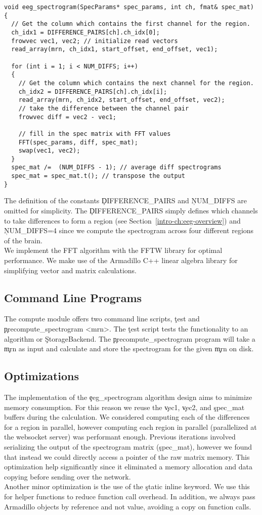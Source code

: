 \begin{lstlisting}
void eeg_spectrogram(SpecParams* spec_params, int ch, fmat& spec_mat)
{
  // Get the column which contains the first channel for the region.
  ch_idx1 = DIFFERENCE_PAIRS[ch].ch_idx[0];
  frowvec vec1, vec2; // initialize read vectors
  read_array(mrn, ch_idx1, start_offset, end_offset, vec1);

  for (int i = 1; i < NUM_DIFFS; i++)
  {
    // Get the column which contains the next channel for the region.
    ch_idx2 = DIFFERENCE_PAIRS[ch].ch_idx[i];
    read_array(mrn, ch_idx2, start_offset, end_offset, vec2);
    // take the difference between the channel pair
    frowvec diff = vec2 - vec1;

    // fill in the spec matrix with FFT values
    FFT(spec_params, diff, spec_mat);
    swap(vec1, vec2);
  }
  spec_mat /=  (NUM_DIFFS - 1); // average diff spectrograms
  spec_mat = spec_mat.t(); // transpose the output
}
\end{lstlisting}

The definition of the constants \c{DIFFERENCE\_PAIRS} and \c{NUM\_DIFFS} are
omitted for simplicity. The \c{DIFFERENCE\_PAIRS} simply defines which channels
to take differences to form a region (see Section~\ref{intro-ch:eeg-overview})
and \c{NUM\_DIFFS=4} since we compute the spectrogram across four different
regions of the brain. \\

We implement the FFT algorithm with the FFTW library \cite{fftw} for optimal
performance. We make use of the Armadillo C++ linear algebra library
\cite{arma} for simplifying vector and matrix calculations.

\subsection{Command Line Programs}\label{compute-ch:implementation-cmd}

The compute module offers two command line scripts, \c{test} and
\c{precompute\_spectrogram <mrn>}. The \c{test} script tests the functionality
to an algorithm or \c{StorageBackend}. The \c{precompute\_spectrogram} program
will take a \c{mrn} as input and calculate and store the spectrogram for the
given \c{mrn} on disk.

\subsection{Optimizations}

The implementation of the \c{eeg\_spectrogram} algorithm design aims to
minimize memory consumption. For this reason we reuse the \c{vec1}, \c{vec2},
and \c{spec\_mat} buffers during the calculation. We considered computing each
of the differences for a region in parallel, however computing each region in
parallel (parallelized at the websocket server) was performant enough. Previous
iterations involved serializing the output of the spectrogram matrix
(\c{spec\_mat}), however we found that instead we could directly access a
pointer of the raw matrix memory. This optimization help significantly since it
eliminated a memory allocation and data copying before sending over the
network. \\

Another minor optimization is the use of the \c{static inline} keyword. We use
this for helper functions to reduce function call overhead. In addition, we
always pass Armadillo objects by reference and not value, avoiding a copy on
function calls.

